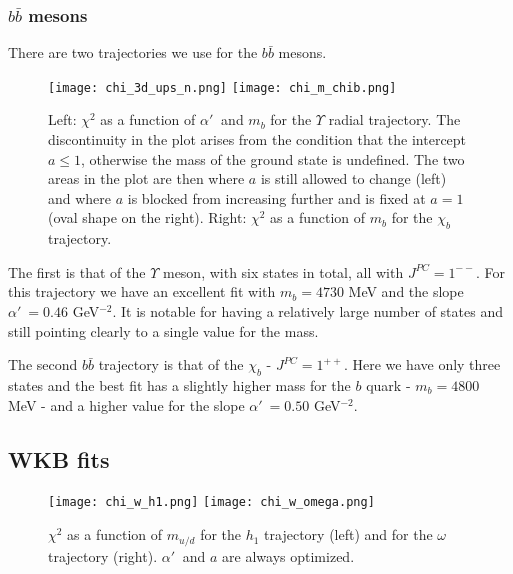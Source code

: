\documentclass[11pt,a4]{article}
\newcommand{\alp}{\ensuremath{\alpha'\:}}
\newcommand{\bbb}{b\bar{b}}
\newcommand{\mud}{m_{u/d}}
\begin{document}
	\subsubsection{\texorpdfstring{$\bbb$}{b-bbar} mesons}
	There are two trajectories we use for the \(\bbb\) mesons.
	\begin{figure}[t!] \centering
						\texttt{[image: chi\_3d\_ups\_n.png]}	 \hfill
						\texttt{[image: chi\_m\_chib.png]}
						\caption{\label{fig:chi_n_bb} Left: \(\chi^2\) as a function of \(\alp\) and \(m_b\) for the \(\Upsilon\) radial trajectory. The discontinuity in the plot arises from the condition that the intercept \(a \leq 1\), otherwise the mass of the ground state is undefined. The two areas in the plot are then where \(a\) is still allowed to change (left) and where \(a\) is blocked from increasing further and is fixed at \(a = 1\) (oval shape on the right). Right: \(\chi^2\) as a function of \(m_b\) for the \(\chi_b\) trajectory.}
				\end{figure}
	
	The first is that of the \(\Upsilon\) meson, with six states in total, all with \(J^{PC} = 1^{--}\). For this trajectory we have an excellent fit with \(m_b = 4730\) MeV and the slope \(\alp = 0.46\) GeV\(^{-2}\). It is notable for having a relatively large number of states and still pointing clearly to a single value for the mass.
	
	The second \(\bbb\) trajectory is that of the \(\chi_b\) - \(J^{PC} = 1^{++}\). Here we have only three states and the best fit has a slightly higher mass for the \(b\) quark - \(m_b = 4800\) MeV - and a higher value for the slope \(\alp = 0.50\) GeV\(^{-2}\).


\subsection{WKB fits}

\begin{figure}[t!] \centering
						\texttt{[image: chi\_w\_h1.png]}	 \hfill
						\texttt{[image: chi\_w\_omega.png]}
						\caption{\label{fig:chi_w_ud} \(\chi^2\) as a function of \(\mud\) for the \(h_1\) trajectory (left) and for the \(\omega\) trajectory (right). \(\alp\) and \(a\) are always optimized.}
				\end{figure}
				
\end{document}
